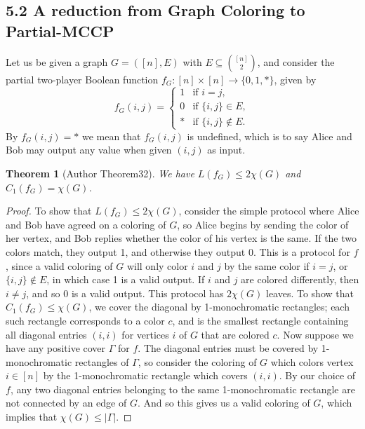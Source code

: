 \documentclass[10pt,a4paper]{article}
\newtheorem{nttheorem}{Theorem}
\begin{document}
\subsection*{5.2 A reduction from Graph Coloring to Partial-MCCP}
Let us be given a graph $G=([n],E)$ with $E\subseteq\binom{[n]}2$, and consider the partial two-player Boolean function $f_G:[n]\times[n]\to\{0,1,*\}$, given by
\[f_G(i,j)=\begin{cases}1&\text{if }i=j,\\0&\text{if }\{i,j\}\in E,\\ *&\text{if }\{i,j\}\notin E.\end{cases}\]
By $f_G(i,j)=*$ we mean that $f_G(i,j)$ is undefined, which is to say Alice and Bob may output any value when given $(i,j)$ as input.
\setcounter{nttheorem}{31}
\begin{nttheorem}[Author Theorem32]
We have $L(f_G)\leq2\chi(G)$ and $C_1(f_G)=\chi(G)$.
\end{nttheorem}
\begin{proof}
To show that $L(f_G)\leq2\chi(G)$, consider the simple protocol where Alice and Bob have agreed on a coloring of $G$, so Alice begins by sending the color of her vertex, and Bob replies whether the color of his vertex is the same. If the two colors match, they output 1, and otherwise they output 0.
This is a protocol for $f$, since a valid coloring of $G$ will only color $i$ and $j$ by the same color if $i=j$, or $\{i,j\}\notin E$, in which case 1 is a valid output. If $i$ and $j$ are colored differently, then $i\ne j$, and so 0 is a valid output. This protocol has $2\chi(G)$ leaves.
To show that $C_1(f_G)\leq\chi(G)$, we cover the diagonal by 1-monochromatic rectangles; each such rectangle corresponds to a color $c$, and is the smallest rectangle containing all diagonal entries $(i,i)$ for vertices $i$ of $G$ that are colored $c$.
Now suppose we have any positive cover $\Gamma$ for $f$. The diagonal entries must be covered by 1-monochromatic rectangles of $\Gamma$, so consider the coloring of $G$ which colors vertex $i\in[n]$ by the 1-monochromatic rectangle which covers $(i,i)$. By our choice of $f$, any two diagonal entries belonging to the same 1-monochromatic rectangle are not connected by an edge of $G$. And so this gives us a valid coloring of $G$, which implies that $\chi(G)\leq|\Gamma|$.
\end{proof}
\end{document}
